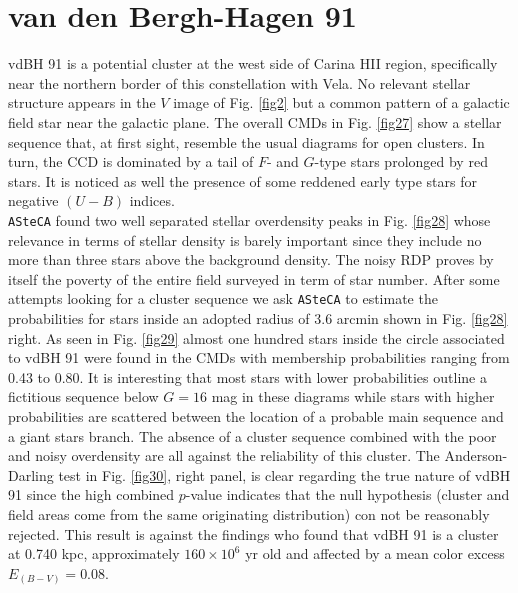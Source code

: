 \documentclass[draft]{aa}
\begin{document}
\section{van den Bergh-Hagen 91}

vdBH 91 is a potential cluster at the west side of Carina HII
region, specifically near the northern border of this constellation with Vela.
No relevant stellar structure appears in the $V$ image of Fig. \ref{fig2} but a
common pattern of a galactic field star near the galactic plane. The overall
CMDs in Fig. \ref{fig27} show a stellar sequence that, at first sight, resemble
the usual diagrams for open clusters. In turn, the CCD
is dominated by a tail of $F$- and $G$-type stars prolonged by red stars. It is
noticed as well the presence of some reddened early type stars for negative
$(U-B)$ indices.\\

\texttt{ASteCA} found two well separated stellar overdensity peaks in Fig.
\ref{fig28} whose relevance in terms of stellar density is barely important
since they include no more than three stars above the background density. The
noisy RDP proves by itself the poverty of the entire field surveyed in term of
star number. After some attempts looking for a cluster sequence we ask
\texttt{ASteCA} to estimate the probabilities for stars inside an adopted radius
of 3.6 arcmin shown in Fig. \ref{fig28} right. As seen in Fig. \ref{fig29}
almost one hundred stars inside the circle associated to vdBH 91 were
found in the CMDs with membership probabilities ranging from 0.43 to 0.80.
It is interesting that most stars with lower probabilities outline a fictitious
sequence below $G=16$ mag in these diagrams while stars with higher
probabilities are scattered between the location of a probable main sequence and
a giant stars branch. The absence of a cluster sequence combined with the
poor and noisy overdensity are all against the reliability of this cluster.
%
The Anderson-Darling test in Fig. \ref{fig30}, right panel, is clear regarding
the true nature of vdBH 91 since the high combined $p$-value
indicates that the null hypothesis (cluster and field areas come from the same
originating distribution) con not be reasonably rejected. This result is against
the \cite{Kharchenko_2005} findings who found that vdBH 91 is a cluster at
0.740 kpc, approximately $160\times10^6$ yr old and affected by a mean color
excess $E_{(B-V)} = 0.08$.\\
\end{document}
